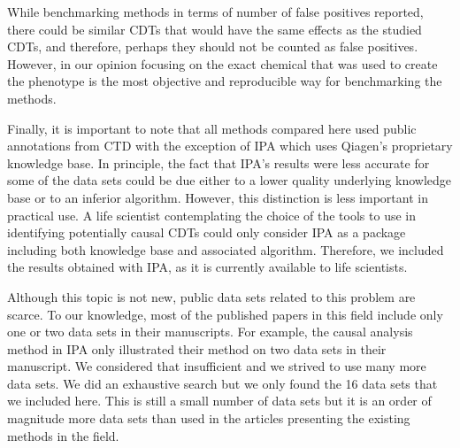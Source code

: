 
While benchmarking methods in terms of number of false positives reported, there could be similar CDTs that would have the same effects as the studied CDTs, and therefore, perhaps they should not be counted as false positives. However, in our opinion focusing on the exact chemical that was used to create the phenotype is the most objective and reproducible way for benchmarking the methods.

Finally, it is important to note that all methods compared here used public annotations from CTD with the exception of IPA which uses Qiagen's proprietary knowledge base. In principle, the fact that IPA's results were less accurate for some of the data sets could be due either to a lower quality underlying knowledge base or to an inferior algorithm. However, this distinction is less important in practical use. A life scientist contemplating the choice of the tools to use in identifying potentially causal CDTs could only consider IPA as a package including both knowledge base and associated algorithm. Therefore, we included the results obtained with IPA, as it is currently available to life scientists. 

Although this topic is not new, public data sets related to this problem are scarce. To our knowledge, most of the published papers in this field include only one or two data sets in their manuscripts. For example, the causal analysis method in IPA only illustrated their method on two data sets in their manuscript. We considered that insufficient and we strived to use many more data sets. We did an exhaustive search but we only found the 16 data sets that we included here. This is still a small number of data sets but it is an order of magnitude more data sets than used in the articles presenting the existing methods in the field.

